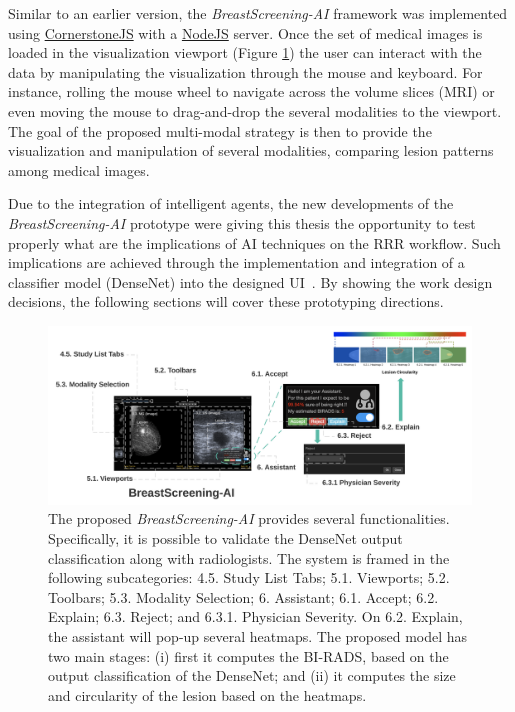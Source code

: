 Similar to an earlier version, the {\it BreastScreening-AI} framework was implemented using \href{https://cornerstonejs.org/}{CornerstoneJS} with a \href{https://nodejs.org/}{NodeJS} server.
Once the set of medical images is loaded in the visualization viewport (Figure \ref{fig:fig040}) the user can interact with the data by manipulating the visualization through the mouse and keyboard.
For instance, rolling the mouse wheel to navigate across the volume slices (\acs{MRI}) or even moving the mouse to drag-and-drop the several modalities to the viewport.
The goal of the proposed multi-modal strategy is then to provide the visualization and manipulation of several modalities, comparing lesion patterns among medical images.

Due to the integration of intelligent agents, the new developments of the {\it BreastScreening-AI} prototype were giving this thesis the opportunity to test properly what are the implications of \ac{AI} techniques on the \ac{RRR} workflow.
Such implications are achieved through the implementation and integration of a classifier model (DenseNet) into the designed \ac{UI}~\cite{maicas2018training}.
By showing the work design decisions, the following sections will cover these prototyping directions.

\begin{figure}[htbp]
\centering
\includegraphics[width=\textwidth]{images/fig040}
\caption{The proposed {\it BreastScreening-AI} provides several functionalities. Specifically, it is possible to validate the DenseNet output classification along with radiologists. The system is framed in the following subcategories: 4.5. Study List Tabs; 5.1. Viewports; 5.2. Toolbars; 5.3. Modality Selection; 6. Assistant; 6.1. Accept; 6.2. Explain; 6.3. Reject; and 6.3.1. Physician Severity. On 6.2. Explain, the assistant will pop-up several heatmaps. The proposed model has two main stages: (i)  first it computes the BI-RADS, based on the output classification of the DenseNet; and (ii) it computes the size and circularity of the lesion based on the heatmaps.}
\label{fig:fig040}
\end{figure}

